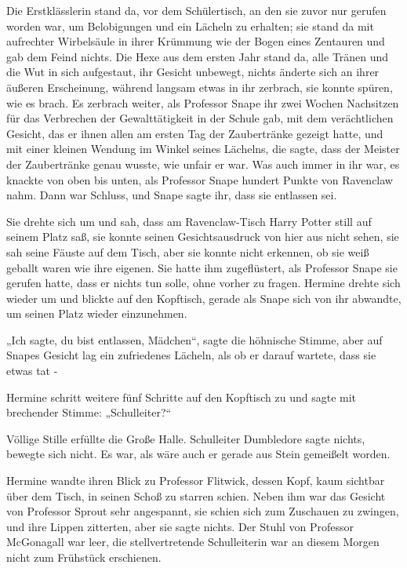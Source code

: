{Die Erstklässlerin stand da, vor dem Schülertisch, an den sie zuvor nur gerufen worden war, um Belobigungen und ein Lächeln zu erhalten; sie stand da mit aufrechter Wirbelsäule in ihrer Krümmung wie der Bogen eines Zentauren und gab dem Feind nichts. Die Hexe aus dem ersten Jahr stand da, alle Tränen und die Wut in sich aufgestaut, ihr Gesicht unbewegt, nichts änderte sich an ihrer äußeren Erscheinung, während langsam etwas in ihr zerbrach, sie konnte spüren, wie es brach. Es zerbrach weiter, als Professor Snape ihr zwei Wochen Nachsitzen für das Verbrechen der Gewalttätigkeit in der Schule gab, mit dem verächtlichen Gesicht, das er ihnen allen am ersten Tag der Zaubertränke gezeigt hatte, und mit einer kleinen Wendung im Winkel seines Lächelns, die sagte, dass der Meister der Zaubertränke genau wusste, wie unfair er war. Was auch immer in ihr war, es knackte von oben bis unten, als Professor Snape hundert Punkte von Ravenclaw nahm. Dann war Schluss, und Snape sagte ihr, dass sie entlassen sei.

Sie drehte sich um und sah, dass am Ravenclaw-Tisch Harry Potter still auf seinem Platz saß, sie konnte seinen Gesichtsausdruck von hier aus nicht sehen, sie sah seine Fäuste auf dem Tisch, aber sie konnte nicht erkennen, ob sie weiß geballt waren wie ihre eigenen. Sie hatte ihm zugeflüstert, als Professor Snape sie gerufen hatte, dass er nichts tun solle, ohne vorher zu fragen. Hermine drehte sich wieder um und blickte auf den Kopftisch, gerade als Snape sich von ihr abwandte, um seinen Platz wieder einzunehmen.

„Ich sagte, du bist entlassen, Mädchen“, sagte die höhnische Stimme, aber auf Snapes Gesicht lag ein zufriedenes Lächeln, als ob er darauf wartete, dass sie etwas tat -

Hermine schritt weitere fünf Schritte auf den Kopftisch zu und sagte mit brechender Stimme: „Schulleiter?“

Völlige Stille erfüllte die Große Halle. Schulleiter Dumbledore sagte nichts, bewegte sich nicht. Es war, als wäre auch er gerade aus Stein gemeißelt worden.

Hermine wandte ihren Blick zu Professor Flitwick, dessen Kopf, kaum sichtbar über dem Tisch, in seinen Schoß zu starren schien. Neben ihm war das Gesicht von Professor Sprout sehr angespannt, sie schien sich zum Zuschauen zu zwingen, und ihre Lippen zitterten, aber sie sagte nichts. Der Stuhl von Professor McGonagall war leer, die stellvertretende Schulleiterin war an diesem Morgen nicht zum Frühstück erschienen.

}

